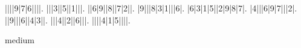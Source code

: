 \begin{sudoku}
||||9|7|6||||.
|||3||5||1|||.
||6|9||8||7|2||.
|9|||8|3|1|||6|.
|6|3|1|5||2|9|8|7|.
|4|||6|9|7|||2|.
||9|||6||4|3||.
|||4||2||6|||.
||||4|1|5||||.
\end{sudoku}
\begin{center}
medium\end{center}